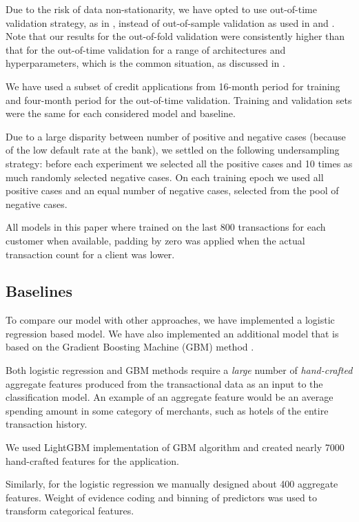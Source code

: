 \documentclass[sigconf]{acmart}
\begin{document}
Due to the risk of data non-stationarity, we have opted to use out-of-time validation strategy, as in \cite{KVAMME2018207}, instead of out-of-sample validation as used in \cite{khandani2010consumer} and \cite{bellotti2013forecasting}. Note that our results for the out-of-fold validation were consistently higher than that for the out-of-time validation for a range of architectures and hyperparameters, which is the common situation, as discussed in \cite{glennon2008development}.

We have used a subset of credit applications from 16-month period for training and four-month period for the out-of-time validation. Training and validation sets were the same for each considered model and baseline.

Due to a large disparity between number of positive and negative cases (because of the low default rate at the bank), we settled on the following undersampling strategy: before each experiment we selected all the positive cases and 10 times as much randomly selected negative cases. On each training epoch we used all positive cases and an equal number of negative cases, selected from the pool of negative cases.

All models in this paper where trained on the last 800 transactions for each customer when available, padding by zero was applied when the actual transaction count for a client was lower.

\subsection{Baselines}

To compare our model with other approaches, we have implemented a logistic regression based model. We have also implemented an additional model that is based on the Gradient Boosting Machine (GBM) method \cite{friedman2001greedy}.

Both logistic regression and GBM methods require a \textit{large} number of \textit{hand-crafted} aggregate features produced from the transactional data as an input to the classification model. An example of an aggregate feature would be an average spending amount in some category of merchants, such as hotels of the entire transaction history.

We used LightGBM\cite{Ke2017LightGBMAH} implementation of GBM algorithm and created nearly 7000 hand-crafted features for the application.

Similarly, for the logistic regression we manually designed about 400 aggregate features. Weight of evidence coding and binning of predictors \cite{lund2016woe} was used to transform categorical features.
\end{document}
